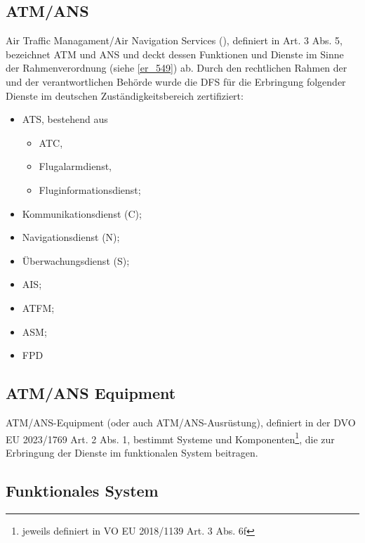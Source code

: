 
\subsection{ATM/ANS}\label{beg:atmans}

Air Traffic Managament/Air Navigation Services (\atmans), definiert in  Art. 3 Abs. 5, bezeichnet \acf{ATM} und \acf{ANS} und deckt dessen Funktionen und Dienste im Sinne der Rahmenverordnung (siehe \ref{er_549}) ab.
Durch den rechtlichen Rahmen der  und der verantwortlichen Behörde wurde die DFS für die Erbringung folgender \atmans{} Dienste im deutschen Zuständigkeitsbereich zertifiziert: \cite[17]{ba_technik}
\begin{itemize}
    \item \acf{ATS}, bestehend aus
    \begin{itemize}
        \item \acf{ATC},
        \item Flugalarmdienst,
        \item Fluginformationsdienst;
    \end{itemize}
    \item  Kommunikationsdienst (C);
    \item  Navigationsdienst (N);
    \item  Überwachungsdienst (S);
    \item  \acf{AIS};
    \item  \acf{ATFM};
    \item  \acf{ASM};
    \item  \acf{FPD}
\end{itemize}

\subsection{ATM/ANS Equipment}

ATM/ANS-Equipment (oder auch ATM/ANS-Ausrüstung), definiert in der \acf{DVO} \acs{EU} 2023/1769 Art. 2 Abs. 1, bestimmt Systeme und Komponenten\footnote{jeweils definiert in VO EU 2018/1139 Art. 3 Abs. 6f}, die zur Erbringung der Dienste im funktionalen System beitragen.

\subsection{Funktionales System}

